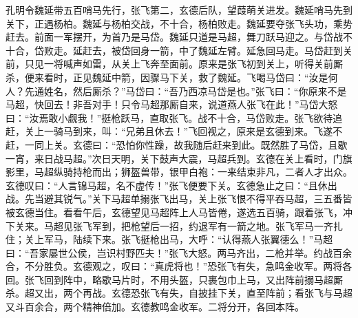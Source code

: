 孔明令魏延带五百哨马先行，张飞第二，玄德后队，望葭萌关进发。魏延哨马先到关下，正遇杨柏。魏延与杨柏交战，不十合，杨柏败走。魏延要夺张飞头功，乘势赶去。前面一军摆开，为首乃是马岱。魏延只道是马超，舞刀跃马迎之。与岱战不十合，岱败走。延赶去，被岱回身一箭，中了魏延左臂。延急回马走。马岱赶到关前，只见一将喊声如雷，从关上飞奔至面前。原来是张飞初到关上，听得关前厮杀，便来看时，正见魏延中箭，因骤马下关，救了魏延。飞喝马岱曰：“汝是何人？先通姓名，然后厮杀？”马岱曰：“吾乃西凉马岱是也。”张飞曰：“你原来不是马超，快回去！非吾对手！只令马超那厮自来，说道燕人张飞在此！”马岱大怒曰：“汝焉敢小觑我！”挺枪跃马，直取张飞。战不十合，马岱败走。张飞欲待追赶，关上一骑马到来，叫：“兄弟且休去！”飞回视之，原来是玄德到来。飞遂不赶，一同上关。玄德曰：“恐怕你性躁，故我随后赶来到此。既然胜了马岱，且歇一宵，来日战马超。”次日天明，关下鼓声大震，马超兵到。玄德在关上看时，门旗影里，马超纵骑持枪而出；狮盔兽带，银甲白袍：一来结束非凡，二者人才出众。玄德叹曰：“人言锦马超，名不虚传！”张飞便要下关。玄德急止之曰：“且休出战。先当避其锐气。”关下马超单搦张飞出马，关上张飞恨不得平吞马超，三五番皆被玄德当住。看看午后，玄德望见马超阵上人马皆倦，遂选五百骑，跟着张飞，冲下关来。马超见张飞军到，把枪望后一招，约退军有一箭之地。张飞军马一齐扎住；关上军马，陆续下来。张飞挺枪出马，大呼：“认得燕人张翼德么！”马超曰：“吾家屡世公侯，岂识村野匹夫！”张飞大怒。两马齐出，二枪并举。约战百余合，不分胜负。玄德观之，叹曰：“真虎将也！”恐张飞有失，急鸣金收军。两将各回。张飞回到阵中，略歇马片时，不用头盔，只裹包巾上马，又出阵前搦马超厮杀。超又出，两个再战。玄德恐张飞有失，自披挂下关，直至阵前；看张飞与马超又斗百余合，两个精神倍加。玄德教鸣金收军。二将分开，各回本阵。

